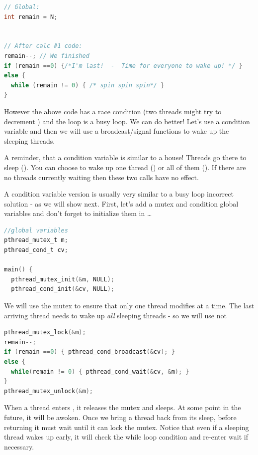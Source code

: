 \begin{lstlisting}[language=C]
// Global: 
int remain = N;


// After calc #1 code:
remain--; // We finished
if (remain ==0) {/*I'm last!  -  Time for everyone to wake up! */ }
else {
  while (remain != 0) { /* spin spin spin*/ }
}
\end{lstlisting}

However the above code has a race condition (two threads might try to decrement ) and the loop is a busy loop. We can do better! Let's use a condition variable and then we will use a broadcast/signal functions to wake up the sleeping threads.

A reminder, that a condition variable is similar to a house! Threads go there to sleep (). You can choose to wake up one thread () or all of them (). If there are no threads currently waiting then these two calls have no effect.

A condition variable version is usually very similar to a busy loop incorrect solution - as we will show next. First, let's add a mutex and condition global variables and don't forget to initialize them in  \ldots{}

\begin{lstlisting}[language=C]
//global variables
pthread_mutex_t m;
pthread_cond_t cv;

main() {
  pthread_mutex_init(&m, NULL);
  pthread_cond_init(&cv, NULL);
\end{lstlisting}

We will use the mutex to ensure that only one thread modifies  at a time. The last arriving thread needs to wake up \emph{all} sleeping threads - so we will use  not 

\begin{lstlisting}[language=C]
pthread_mutex_lock(&m);
remain--; 
if (remain ==0) { pthread_cond_broadcast(&cv); }
else {
  while(remain != 0) { pthread_cond_wait(&cv, &m); }
}
pthread_mutex_unlock(&m);
\end{lstlisting}

When a thread enters , it releases the mutex and sleeps. At some point in the future, it will be awoken. Once we bring a thread back from its sleep, before returning it must wait until it can lock the mutex. Notice that even if a sleeping thread wakes up early, it will check the while loop condition and re-enter wait if necessary.


